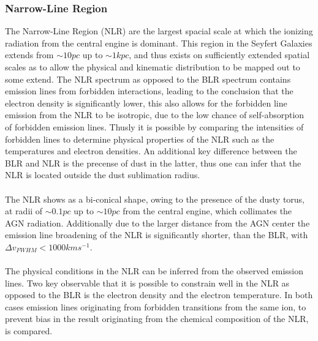 \documentclass[a4paper, 12pt, twoside]{article}
\begin{document}
\subsubsection{Narrow-Line Region}
The Narrow-Line Region (NLR) are the largest spacial scale at which the ionizing radiation from the central engine is dominant. This region in the Seyfert Galaxies extends from $\sim 10 pc$ up to $\sim 1 kpc$, and thus exists on sufficiently extended spatial scales as to allow the physical and kinematic distribution to be mapped out to some extend. The NLR spectrum as opposed to the BLR spectrum contains emission lines from forbidden interactions, leading to the conclusion that the electron density is significantly lower, this also allows for the forbidden line emission from the NLR to be isotropic, due to the low chance of self-absorption of forbidden emission lines. Thusly it is possible by comparing the intensities of forbidden lines to determine physical properties of the NLR such as the temperatures and electron densities. An additional key difference between the BLR and NLR is the precense of dust in the latter, thus one can infer that the NLR is located outside the dust sublimation radius.\\
\\
The NLR shows as a bi-conical shape, owing to the presence of the dusty torus, at radii of $\sim 0.1 pc$ up to $\sim 10 pc$ from the central engine, which collimates the AGN radiation. Additionally due to the larger distance from the AGN center the emission line broadening of the NLR is significantly shorter, than the BLR, with $\Delta v_{FWHM} < 1000 kms^{-1}$.\\
\\
The physical conditions in the NLR can be inferred from the observed emission lines. Two key observable that it is possible to constrain well in the NLR as opposed to the BLR is the electron density and the electron temperature. In both cases emission lines originating from forbidden transitions from the same ion, to prevent bias in the result originating from the chemical composition of the NLR, is compared.
\end{document}
